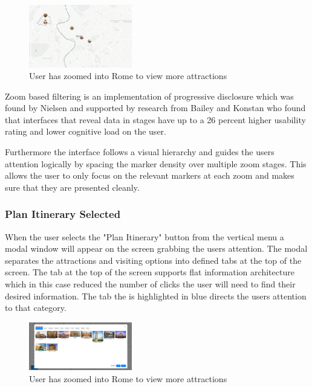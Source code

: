 \documentclass[]{project_final}
\begin{document}
\begin{figure}[H]
  \centering
  \includegraphics[width=0.4\textwidth]{biggerzoom.png}
  \caption{User has zoomed into Rome to view more attractions}
  \label{fig:1}
\end{figure}

Zoom based filtering is an implementation of progressive disclosure which was found by Nielsen and supported by research from Bailey and Konstan who found that interfaces that reveal data in stages have up to a 26 percent higher usability rating and lower cognitive load on the user.

Furthermore the interface follows a visual hierarchy and guides the users attention logically by spacing the marker density over multiple zoom stages. This allows the user to only focus on the relevant markers at each zoom and makes sure that they are presented cleanly.

\subsubsection{Plan Itinerary Selected}

When the user selects the "Plan Itinerary" button from the vertical menu a modal window will appear on the screen grabbing the users attention.
The modal separates the attractions and visiting options into defined tabs at the top of the screen. The tab at the top of the screen supports flat information architecture which in this case reduced the number of clicks the user will need to find their desired information. The tab the is highlighted in blue directs the users attention to that category.

\begin{figure}[H]
  \centering
  \includegraphics[width=0.4\textwidth]{planItin.png}
  \caption{User has zoomed into Rome to view more attractions}
  \label{fig:1}
\end{figure}
\end{document}
